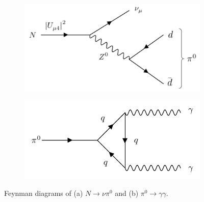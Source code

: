 \begin{figure}[htbp!]
\begin{subfigure}[h]{0.49\linewidth}
\centering    
\includegraphics[width=\linewidth]{N_to_pi0_edit}
\caption{}
\label{fig:HNLdecaydiagram}
\end{subfigure}
\hfill
\begin{subfigure}[h]{0.49\linewidth}
\centering    
\includegraphics[width=\linewidth]{pi0_to_gam}
\caption{}
\label{fig:pi0decaydiagram}
\end{subfigure}%
\caption[Heavy Neutral Lepton and Neutral Pion Decay Feynman Diagrams]{
Feynman diagrams of (a) $N \rightarrow \nu \pi^0$ and (b) $\pi^0 \rightarrow \gamma\gamma$.
}
\end{figure}



